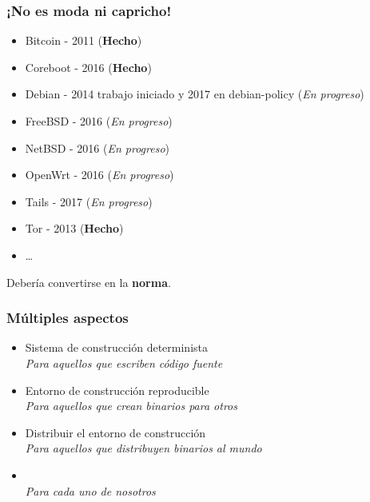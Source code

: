 \documentclass[14pt,aspectratio=169]{beamer}
\begin{document}
\begin{frame}
\frametitle{¡No es moda ni capricho!}

\begin{itemize}
\item Bitcoin - 2011 (\textbf{Hecho})
\item Coreboot - 2016 (\textbf{Hecho})
\item Debian - 2014 trabajo iniciado y 2017 en debian-policy (\emph{En progreso})
\item FreeBSD - 2016 (\emph{En progreso})
\item NetBSD - 2016 (\emph{En progreso})
\item OpenWrt - 2016 (\emph{En progreso})
\item Tails - 2017 (\emph{En progreso})
\item Tor - 2013 (\textbf{Hecho})
\item \ldots{}
\end{itemize}

\end{frame}

\begin{frame}[plain]
\begin{center}
\Huge Debería convertirse en la \textbf{norma}.


\end{center}
\end{frame}

\begin{frame}
\frametitle{Múltiples aspectos}

\begin{itemize}
\item Sistema de construcción determinista \\
  \textit{\small Para aquellos que escriben código fuente}
\item Entorno de construcción reproducible \\
  \textit{\small Para aquellos que crean binarios para otros}
\item Distribuir el entorno de construcción \\
  \textit{\small Para aquellos que distribuyen binarios al mundo}
\item \color{gray}{Realizar una reconstrucción y verificar los resultados} \\
  \textit{\small Para cada uno de nosotros}
\end{itemize}

\end{frame}
\end{document}

